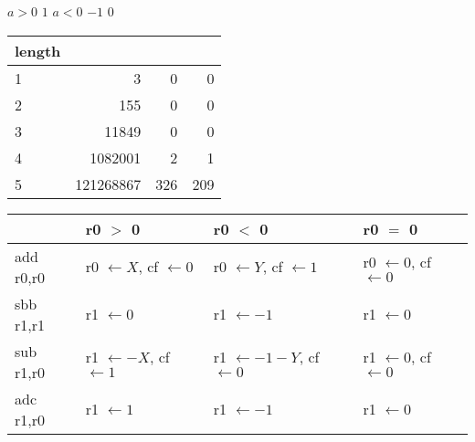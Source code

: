 \documentclass{beamer}
\renewcommand{\gets}{\leftarrow}
\newcommand{\AND}{\land}
\newcommand{\IOR}{\lor}
\newcommand{\XOR}{\oplus}
\begin{document}
%

\begin{frame}
\end{frame}

\begin{frame}
\begin{codebox}
\zi \If $a > 0$ \Do
\zi   \Return $1$ \End
\zi \If $a < 0$ \Do
\zi   \Return $-1$ \End
\zi \Return $0$
\end{codebox}
\end{frame}

\begin{frame}
\begin{table}
\tiny
\begin{tabular}{l|rrr}
length & & & \\
\hline
1 &         3 &   0 &   0 \\
2 &       155 &   0 &   0 \\
3 &     11849 &   0 &   0 \\
4 &   1082001 &   2 &   1 \\
5 & 121268867 & 326 & 209 \\
\end{tabular}
\end{table}
\end{frame}

\begin{frame}
\begin{table}
\tiny
\begin{tabular}{l|lll}
& r0 $>$ 0
& r0 $<$ 0
& r0 $=$ 0 \\
\hline
add r0,r0
& r0 $\gets X$, cf $\gets 0$
& r0 $\gets Y$, cf $\gets 1$
& r0 $\gets 0$, cf $\gets 0$ \\
sbb r1,r1
& r1 $\gets 0$
& r1 $\gets -1$
& r1 $\gets 0$ \\
sub r1,r0
& r1 $\gets -X$, cf $\gets 1$
& r1 $\gets -1-Y$, cf $\gets 0$
& r1 $\gets 0$, cf $\gets 0$ \\
adc r1,r0
& r1 $\gets 1$
& r1 $\gets -1$
& r1 $\gets 0$ \\
\end{tabular}
\end{table}
\end{frame}
\end{document}
